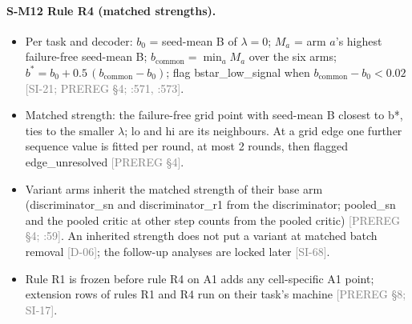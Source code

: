 \documentclass[11pt]{article}
\newcommand{\src}[1]{{\scriptsize\textcolor{gray}{[#1]}}}
\begin{document}
\paragraph{S-M12 Rule R4 (matched strengths).}
\begin{itemize}
\item Per task and decoder: $b_0$ = seed-mean B of $\lambda = 0$; $M_a$ = arm $a$'s highest failure-free seed-mean B; $b_{\mathrm{common}} = \min_a M_a$ over the six arms; $b^* = b_0 + 0.5\,(b_{\mathrm{common}} - b_0)$; flag bstar\_low\_signal when $b_{\mathrm{common}} - b_0 < 0.02$ \src{SI-21; PREREG \S4; :571, :573}.
\item Matched strength: the failure-free grid point with seed-mean B closest to b*, ties to the smaller $\lambda$; lo and hi are its neighbours. At a grid edge one further sequence value is fitted per round, at most 2 rounds, then flagged edge\_unresolved \src{PREREG \S4}.
\item Variant arms inherit the matched strength of their base arm (discriminator\_sn and discriminator\_r1 from the discriminator; pooled\_sn and the pooled critic at other step counts from the pooled critic) \src{PREREG \S4; :59}. An inherited strength does not put a variant at matched batch removal \src{D-06}; the follow-up analyses are locked later \src{SI-68}.
\item Rule R1 is frozen before rule R4 on A1 adds any cell-specific A1 point; extension rows of rules R1 and R4 run on their task's machine \src{PREREG \S8; SI-17}.
\end{itemize}
\end{document}
